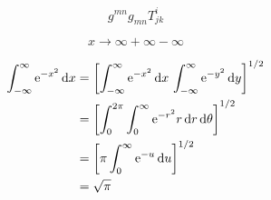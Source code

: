 \documentclass { article }
\begin{document}
\def\ee{\mathrm{e}}
\def\ii{\mathrm{i}}
\def\bm{\symbf}
\newcommand{\innerprod}[2]{\left\langle{#1}\middle\vert{#2}\right\rangle}
\newcommand{\brakket}[3]{\left\langle{#1}\middle\vert{#2}\middle\vert{#3}\right\rangle}

\[ g^{mn} g_{mn} T^{i}_{jk} \]

\[ x \to \infty + \infty - \infty \]

\begin{align*}
     \int_{-\infty}^\infty \ee^{-x^2} \dd{x}
  &= \qty[\int_{-\infty}^\infty \ee^{-x^2} \dd{x} \, \int_{-\infty}^\infty \ee^{-y^2} \dd{y}]^{1/2} \\
  &= \qty[\int_0^{2\pi} \int_0^\infty \ee^{-r^2} r \dd{r}\dd{\theta}]^{1/2} \\
  &= \qty[\pi \int_0^\infty \ee^{-u} \dd{u}]^{1/2} \\
  &= \sqrt{\pi}
\end{align*}
\end{document}
